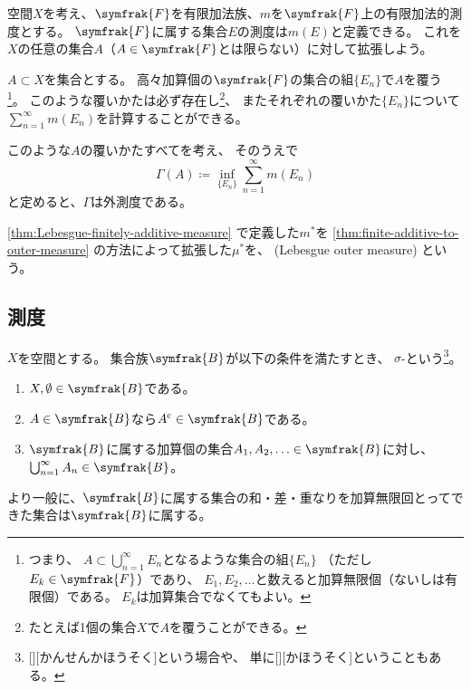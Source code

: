 \documentclass[../sotsu.tex]{subfiles}
\begin{document}
\begin{theorem}
    \label{thm:finite-additive-to-outer-measure}
    空間$X$を考え、$\symfrak{F}$を有限加法族、$m$を$\symfrak{F}$上の有限加法的測度とする。
    $\symfrak{F}$に属する集合$E$の測度は$m(E)$と定義できる。
    これを$X$の任意の集合$A$（$A \in \symfrak{F}$とは限らない）に対して拡張しよう。

    $A \subset X$を集合とする。
    高々加算個の$\symfrak{F}$の集合の組$\{ E_n \}$で$A$を覆う%
    \footnote{
        つまり、
        $\displaystyle A \subset \bigcup_{n=1}^{\infty} E_n$となるような集合の組$ \{ E_n \} $
        （ただし$E_k \in \symfrak{F}$）であり、
        $E_1, E_2, \dotsc$と数えると加算無限個（ないしは有限個）である。
        $E_k$は加算集合でなくてもよい。
    }。
    このような覆いかたは必ず存在し\footnote{たとえば1個の集合$X$で$A$を覆うことができる。}、
    またそれぞれの覆いかた$\{ E_n \}$について
    $\sum_{n=1}^{\infty} m(E_n)$を計算することができる。

    このような$A$の覆いかたすべてを考え、
    そのうえで
    \begin{equation*}
        \Gamma(A)  \coloneq  \inf_{ \{ E_n \} } \sum_{n=1}^{\infty} m(E_n)
    \end{equation*}
    と定めると、$\Gamma$は外測度である。
\end{theorem}


\begin{definition}
    \label{dfn:Lebesgue-outer-measure}
    \cref{thm:Lebesgue-finitely-additive-measure}%
    で定義した$m^*$を%
    \cref{thm:finite-additive-to-outer-measure}%
    の方法によって拡張した$\mu^*$を、
    (Lebesgue outer measure)%
    という。
\end{definition}



\subsection{測度}

\begin{definition}
    $X$を空間とする。
    集合族$\symfrak{B}$が以下の条件を満たすとき、
    $\sigma$-という\footnote{
        [][かんせんかほうそく]という場合や、
        単に[][かほうそく]ということもある。
    }。
    \begin{enumerate}
        \item $X, \emptyset \in \symfrak{B}$である。
        \item $A \in \symfrak{B}$なら$A^{\mathrm{c}} \in \symfrak{B}$である。
        \item $\symfrak{B}$に属する加算個の集合$A_1, A_2, \dotsc \in \symfrak{B}$に対し、
            \(  \bigcup_{n=1}^{\infty} A_n  \in  \symfrak{B}  \)。
    \end{enumerate}
    より一般に、$\symfrak{B}$に属する集合の和・差・重なりを加算無限回とってできた集合は$\symfrak{B}$に属する。
\end{definition}
\end{document}

